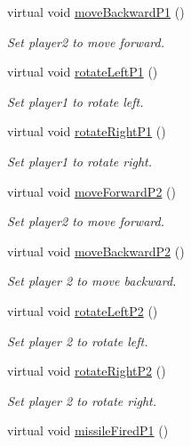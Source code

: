 \begin{DoxyCompactItemize}
virtual void \hyperlink{classGameManagementData_ab023b818d0ffc740fc5574654ff89cfa}{move\-Backward\-P1} ()
\begin{DoxyCompactList}\small\item\em Set player2 to move forward. \end{DoxyCompactList}\item 
virtual void \hyperlink{classGameManagementData_afe92b173c32488f148fc7a2fa3ac0388}{rotate\-Left\-P1} ()
\begin{DoxyCompactList}\small\item\em Set player1 to rotate left. \end{DoxyCompactList}\item 
virtual void \hyperlink{classGameManagementData_a933b945bef3e7b15306ed361f611ec2d}{rotate\-Right\-P1} ()
\begin{DoxyCompactList}\small\item\em Set player1 to rotate right. \end{DoxyCompactList}\item 
virtual void \hyperlink{classGameManagementData_ab434e39574c0511a37bd5799607dc782}{move\-Forward\-P2} ()
\begin{DoxyCompactList}\small\item\em Set player2 to move forward. \end{DoxyCompactList}\item 
virtual void \hyperlink{classGameManagementData_a130c7b68c41bfcc92bae027f5db11e68}{move\-Backward\-P2} ()
\begin{DoxyCompactList}\small\item\em Set player 2 to move backward. \end{DoxyCompactList}\item 
virtual void \hyperlink{classGameManagementData_a7b6ba982e678159bd687243facce3ab2}{rotate\-Left\-P2} ()
\begin{DoxyCompactList}\small\item\em Set player 2 to rotate left. \end{DoxyCompactList}\item 
virtual void \hyperlink{classGameManagementData_a93b5d21e2b4e347e8d7051885aab2bb2}{rotate\-Right\-P2} ()
\begin{DoxyCompactList}\small\item\em Set player 2 to rotate right. \end{DoxyCompactList}\item 
virtual void \hyperlink{classGameManagementData_af31200e3fa7302496f48d81ad3934ace}{missile\-Fired\-P1} ()

\end{DoxyCompactItemize}
